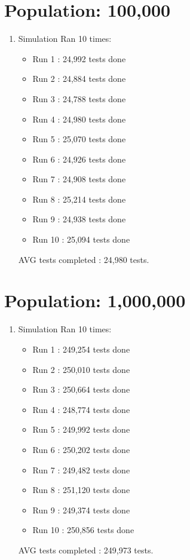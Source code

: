 \documentclass[letterpaper, 10pt,DIV=13]{scrartcl}
\numberwithin{equation}{section} %
\numberwithin{figure}{section} %
\numberwithin{table}{section} %
\begin{document}
\section{Population: 100,000}
\bigskip

\begin{enumerate}
   \item Simulation Ran 10 times:
   \begin{itemize}
     \item Run 1 : 24,992 tests done
     \item Run 2 : 24,884 tests done
     \item Run 3 : 24,788 tests done
     \item Run 4 : 24,980 tests done
     \item Run 5 : 25,070 tests done
     \item Run 6 : 24,926 tests done
     \item Run 7 : 24,908 tests done
     \item Run 8 : 25,214 tests done
     \item Run 9 : 24,938 tests done
     \item Run 10 : 25,094 tests done
   \end{itemize}
   AVG tests completed : 24,980 tests. 
   \bigskip
\end {enumerate}
\section{Population: 1,000,000}
\bigskip

\begin{enumerate}
   \item Simulation Ran 10 times:
   \begin{itemize}
     \item Run 1 : 249,254 tests done
     \item Run 2 : 250,010 tests done
     \item Run 3 : 250,664 tests done
     \item Run 4 : 248,774 tests done
     \item Run 5 : 249,992 tests done
     \item Run 6 : 250,202 tests done
     \item Run 7 : 249,482 tests done
     \item Run 8 : 251,120 tests done
     \item Run 9 : 249,374 tests done
     \item Run 10 : 250,856 tests done
   \end{itemize}
   AVG tests completed : 249,973 tests. 
   \bigskip
\end {enumerate}
\end{document}
